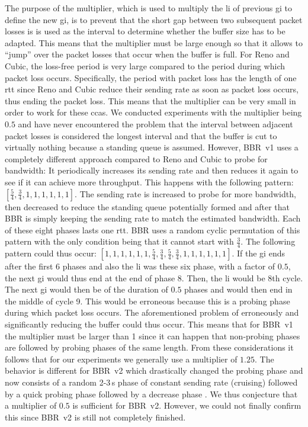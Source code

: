 \documentclass[10pt,sigconf,letterpaper,dvipsnames\ifx\removeHeaders\tempYes ,nonacm\fi\ifx\removeHeaders\tempNo ,anonymous\fi]{acmart}
\begin{document}
The purpose of the multiplier, which is used to multiply the \gls{li} of previous \gls{gi} to define the new \gls{gi}, is to prevent that the short gap between two subsequent packet losses is is used as the interval to determine whether the buffer size has to be adapted. This means that the multiplier must be large enough so that it allows to ``jump'' over the packet losses that occur when the buffer is full. For Reno and Cubic, the loss-free period is very large compared to the period during which packet loss occurs. Specifically, the period with packet loss has the length of one \gls{rtt} since Reno and Cubic reduce their sending rate as soon as packet loss occurs, thus ending the packet loss. This means that the multiplier can be very small in order to work for these \glspl{cca}. We conducted experiments with the multiplier being $0.5$ and have never encountered the problem that the interval between adjacent packet losses is considered the longest interval and that the buffer is cut to virtually nothing because a standing queue is assumed. However, BBR~v1 uses a completely different approach compared to Reno and Cubic to probe for bandwidth: It periodically increases its sending rate and then reduces it again to see if it can achieve more throughput. This happens with the following pattern: $[\frac{5}{4},\frac{3}{4},1,1,1,1,1,1]$. The sending rate is increased to probe for more bandwidth, then decreased to reduce the standing queue potentially formed and after that BBR is simply keeping the sending rate to match the estimated bandwidth. Each of these eight phases lasts one \gls{rtt}. BBR uses a random cyclic permutation of this pattern with the only condition being that it cannot start with $\frac{3}{4}$. The following pattern could thus occur: $[1,1,1,1,1,1,\frac{5}{4},\frac{3}{4},\frac{5}{4},\frac{3}{4},1,1,1,1,1,1]$. If the \gls{gi} ends after the first 6 phases and also the \gls{li} was these six phase, with a factor of $0.5$, the next \gls{gi} would thus end at the end of phase 8. Then, the \gls{li} would be 8th cycle. The next \gls{gi} would then be of the duration of $0.5$ phases and would then end in the middle of cycle 9. This would be erroneous because this is a probing phase during which packet loss occurs. The aforementioned problem of erroneously and significantly reducing the buffer could thus occur. This means that for BBR~v1 the multiplier must be larger than 1 since it can happen that non-probing phases are followed by probing phases of the same length. From these considerations it follows that for our experiments we generally use a multiplier of $1.25$. The behavior is different for BBR~v2 which drastically changed the probing phase and now consists of a random 2-3\,s phase of constant sending rate (cruising) followed by a quick probing phase followed by a decrease phase \cite{cardwell_bbr_2019-1,cardwell_bbr_2019}. We thus conjecture that a multiplier of $0.5$ is sufficient for BBR~v2. However, we could not finally confirm this since BBR~v2 is still not completely finished. 
\end{document}
